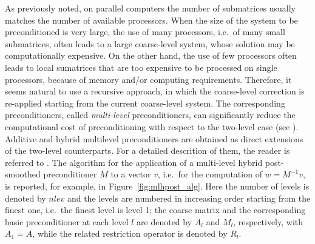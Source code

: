 As previously noted, on parallel computers the number of submatrices usually matches
the number of available processors. When the size of the system to be preconditioned
is very large, the use of many processors, i.e.\ of many small submatrices, often
leads to a large coarse-level system, whose solution may be computationally expensive.
On the other hand, the use of few processors often leads to local sumatrices that
are too expensive to be processed on single processors, because of memory and/or
computing requirements. Therefore, it seems natural to use a recursive approach,
in which the coarse-level correction is re-applied starting from the current
coarse-level system. The corresponding preconditioners, called \emph{multi-level}
preconditioners, can significantly reduce the computational cost of preconditioning
with respect to the two-level case (see \cite[Chapter 3]{dd2_96}). 
Additive and hybrid multilevel preconditioners
are obtained as direct extensions of the two-level counterparts.
For a detailed descrition of them, the reader is
referred to \cite[Chapter 3]{dd2_96}.
The algorithm for the application of a multi-level hybrid 
post-smoothed preconditioner $M$ to a vector $v$, i.e.\ for the
computation of $w=M^{-1}v$, is reported, for
example, in Figure~\ref{fig:mlhpost_alg}. Here the number of levels
is denoted by $nlev$ and the levels are numbered in increasing order starting
from the finest one, i.e.\ the finest level is level 1; the coarse matrix
and the corresponding basic preconditioner at each level $l$ are denoted by $A_l$ and
$M_l$, respectively, with $A_1=A$, while the related restriction operator is
denoted by $R_l$.
% 
